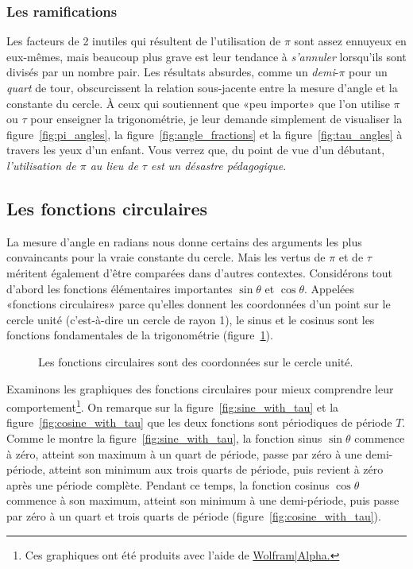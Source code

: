     \subsubsection{Les ramifications} %
    \label{sec:the_ramifications}


Les facteurs de 2 inutiles qui résultent de l'utilisation de $\pi$ sont assez
ennuyeux en eux-mêmes, mais beaucoup plus grave est leur tendance à
\emph{s'annuler} lorsqu'ils sont divisés par un nombre pair. Les résultats
absurdes, comme un \emph{demi}-$\pi$ pour un \emph{quart} de tour, obscurcissent
la relation sous-jacente entre la mesure d'angle et la constante du cercle. À
ceux qui soutiennent que «\ns peu importe\ns » que l'on utilise $\pi$ ou $\tau$ pour
enseigner la trigonométrie, je leur demande simplement de visualiser la
figure~\ref{fig:pi_angles}, la figure~\ref{fig:angle_fractions} et la
figure~\ref{fig:tau_angles} à travers les yeux d'un enfant. Vous verrez que, du
point de vue d'un débutant, \emph{l'utilisation de $\pi$ au lieu de $\tau$ est
un désastre pédagogique}.

  \subsection{Les fonctions circulaires} %
  \label{sec:the_circle_functions}

La mesure d'angle en radians nous donne certains des arguments les plus
convaincants pour la vraie constante du cercle. Mais les vertus de $\pi$ et de $\tau$
méritent également d'être comparées dans d'autres contextes. Considérons tout
d'abord les fonctions élémentaires importantes $\sin\theta$ et $\cos\theta$.
Appelées «\ns fonctions circulaires\ns » parce qu'elles donnent les
coordonnées d'un point sur le cercle unité (c'est-à-dire un cercle de rayon 1),
le sinus et le cosinus sont les fonctions fondamentales de la trigonométrie
(figure~\ref{fig:circle_functions}).

\begin{figure}
\begin{center}
\end{center}
\caption{Les fonctions circulaires sont des coordonnées sur le cercle
unité.\label{fig:circle_functions}}
\end{figure}

Examinons les graphiques des fonctions circulaires pour mieux comprendre
leur comportement\footnote{Ces graphiques ont été produits avec l'aide de
\href{https://www.wolframalpha.com/}{Wolfram|Alpha.}}. On remarque sur la
figure~\ref{fig:sine_with_tau} et la figure~\ref{fig:cosine_with_tau} que les
deux fonctions sont périodiques de période $T$. Comme le montre la
figure~\ref{fig:sine_with_tau}, la fonction sinus $\sin\theta$ commence à zéro,
atteint son maximum à un quart de période, passe par zéro à une demi-période,
atteint son minimum aux trois quarts de période, puis revient à zéro après une
période complète. Pendant ce temps, la fonction cosinus $\cos\theta$ commence à
son maximum, atteint son minimum à une demi-période, puis passe par zéro à un quart et
trois quarts de période (figure~\ref{fig:cosine_with_tau}).

